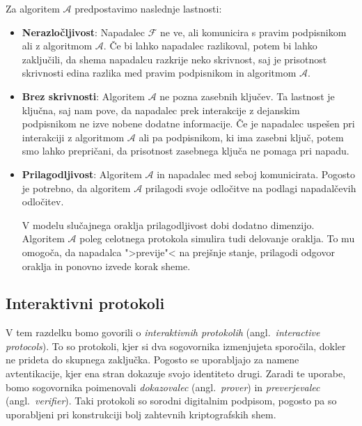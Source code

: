 \documentclass[isrm2, tisk]{fmfdelo}
\begin{document}
Za algoritem $\mathcal{A}$ predpostavimo naslednje lastnosti:
\begin{itemize}
    \item \textbf{Nerazločljivost}: Napadalec $\mathcal{F}$ ne ve, ali komunicira s pravim podpisnikom
        ali z algoritmom $\mathcal{A}$. Če bi lahko napadalec razlikoval, potem bi lahko zaključili,
        da shema napadalcu razkrije neko skrivnost, saj je prisotnost skrivnosti edina razlika med
        pravim podpisnikom in algoritmom $\mathcal{A}$.
    \item \textbf{Brez skrivnosti}: Algoritem $\mathcal{A}$ ne pozna zasebnih ključev. Ta lastnost
        je ključna, saj nam pove, da napadalec prek interakcije z dejanskim podpisnikom ne izve
        nobene dodatne informacije. Če je napadalec uspešen pri interakciji z algoritmom $\mathcal{A}$
        ali pa podpisnikom, ki ima zasebni ključ, potem smo lahko prepričani, da prisotnost zasebnega
        ključa ne pomaga pri napadu.
    \item \textbf{Prilagodljivost}: Algoritem $\mathcal{A}$ in napadalec med seboj komunicirata.
        Pogosto je potrebno, da algoritem $\mathcal{A}$ prilagodi svoje odločitve na podlagi
        napadalčevih odločitev.

        V modelu slučajnega oraklja prilagodljivost dobi dodatno dimenzijo. Algoritem $\mathcal{A}$
        poleg celotnega protokola simulira tudi delovanje oraklja. To mu omogoča, da napadalca ">previje"<
        na prejšnje stanje, prilagodi odgovor oraklja in ponovno izvede korak sheme.
\end{itemize}

\subsection{Interaktivni protokoli}
V tem razdelku bomo govorili o \textit{interaktivnih protokolih} (angl.\ \textit{interactive protocols}).
To so protokoli, kjer si dva sogovornika izmenjujeta sporočila, dokler ne prideta do skupnega zaključka.
Pogosto se uporabljajo za namene avtentikacije, kjer ena stran dokazuje svojo identiteto drugi.
Zaradi te uporabe, bomo sogovornika poimenovali \textit{dokazovalec} (angl.\ \textit{prover}) in
\textit{preverjevalec} (angl.\ \textit{verifier}). Taki protokoli so sorodni digitalnim podpisom,
pogosto pa so uporabljeni pri konstrukciji bolj zahtevnih kriptografskih shem.
\end{document}
